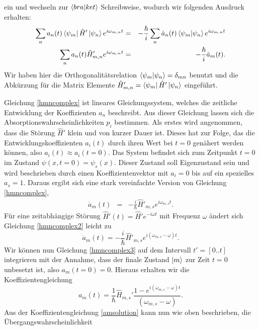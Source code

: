 \documentclass[a4paper,12pt]{article}
\begin{document}
ein und wechseln zur $\braket{bra | ket}$ Schreibweise, wodurch wir folgenden Ausdruck erhalten:
\begin{eqnarray}
  \sum_n a_n(t) \bra{\psi_m}\hat{H}'\ket{\psi_n} e^{i\omega_{m,n}t}&=& -\frac{\hbar}{i}\sum_n \dot{a}_n(t)\braket{\psi_m|\psi_n}  e^{i\omega_{m,n}t} \nonumber\\
  \sum_n a_n(t) \hat{H}'_{m,n} e^{i\omega_{m,n}t}&=&-\frac{\hbar}{i} \dot{a}_m(t).\label{hmncomplex}
\end{eqnarray}
Wir haben hier die Orthogonalitätsrelation $\braket{\psi_m |\psi_n}=\delta_{mn}$ benutzt und die Abkürzung für die Matrix Elemente 
$\hat{H}'_{m,n}=\bra{\psi_m}\hat{H}'\ket{\psi_n}$ eingeführt. 

Gleichung \ref{hmncomplex} ist lineares Gleichungssystem, welches die zeitliche Entwicklung der Koeffizienten $a_n$ beschreibt. Aus dieser Gleichung lassen sich die 
Absorptionswahrscheinlichkeiten $p_i$ bestimmen. Als erstes wird angenommen, dass die Störung $\hat{H}'$ klein und von kurzer Dauer ist. Dieses hat zur Folge,
das die Entwicklungskoeffizienten $a_i(t)$ durch ihren Wert bei $t=0$ genähert werden können, also $a_i(t)\approx a_i(t=0)$. Das System befindet sich zum Zeitpunkt
$t=0$ im Zustand $\psi(x,t=0)=\psi_s(x)$. Dieser Zustand soll Eigenzustand sein und wird beschrieben durch einen Koeffizientenvektor mit $a_i=0$ bis auf ein spezielles $a_s=1$. 
Daraus ergibt sich eine stark vereinfachte Version von Gleichung \ref{hmncomplex}, 
\begin{eqnarray}\label{hmncomplex2}
 \dot{a}_m(t)&=&-\frac{i}{\hbar} \hat{H}'_{m,s} e^{i\omega_{m,s}t} .
\end{eqnarray}
Für eine zeitabhängige Störung $\hat{H}'(t)=\hat{H}'e^{-i\omega t}$ mit Frequenz $\omega$ ändert sich Gleichung \ref{hmncomplex2} leicht zu
\begin{equation}\label{hmncomplex3}
 \dot{a}_m(t) = -\frac{i}{\hbar} \hat{H}'_{m,s} e^{i(\omega_{m,s}-\omega)t} .
\end{equation}
Wir können nun Gleichung \ref{hmncomplex3} auf dem Intervall $t'=[0..t]$ integrieren mit der Annahme, dass der finale Zustand $\ket{m}$ zur Zeit $t=0$ unbesetzt ist, also $a_m(t=0)=0$. 
Hieraus erhalten wir die Koeffizientengleichung
\begin{equation}\label{amsolution}
 a_m(t) = \frac{1}{\hbar} \hat{H}_{m,s}' \frac{1-e^{i(\omega_{m,s}-\omega)t}}{(\omega_{m,s}-\omega)}.
\end{equation}
Aus der Koeffizientengleichung \ref{amsolution} kann nun wie oben beschrieben, die Übergangswahrscheinlichkeit 
\end{document}
